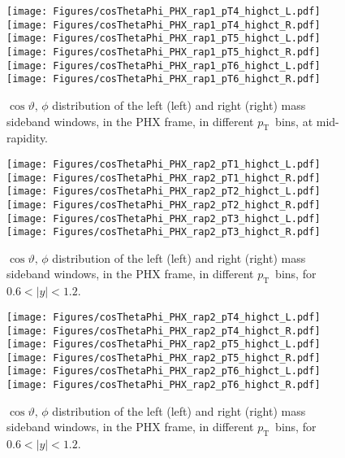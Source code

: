\documentclass[12pt]{article}
\newcommand{\pt}{$p_{\mathrm{T}}$}
\begin{document}
\begin{figure}[htbp]
\centering
\texttt{[image: Figures/cosThetaPhi\_PHX\_rap1\_pT4\_highct\_L.pdf]}
\texttt{[image: Figures/cosThetaPhi\_PHX\_rap1\_pT4\_highct\_R.pdf]}
\texttt{[image: Figures/cosThetaPhi\_PHX\_rap1\_pT5\_highct\_L.pdf]}
\texttt{[image: Figures/cosThetaPhi\_PHX\_rap1\_pT5\_highct\_R.pdf]}
\texttt{[image: Figures/cosThetaPhi\_PHX\_rap1\_pT6\_highct\_L.pdf]}
\texttt{[image: Figures/cosThetaPhi\_PHX\_rap1\_pT6\_highct\_R.pdf]}
\caption{$\cos\vartheta,\,\phi$ distribution of the left (left) and
  right (right) mass sideband windows, in the PHX frame, in different
  \pt\ bins, at mid-rapidity.} 
\end{figure}
\clearpage


\begin{figure}[htbp]
\centering
\texttt{[image: Figures/cosThetaPhi\_PHX\_rap2\_pT1\_highct\_L.pdf]}
\texttt{[image: Figures/cosThetaPhi\_PHX\_rap2\_pT1\_highct\_R.pdf]}
\texttt{[image: Figures/cosThetaPhi\_PHX\_rap2\_pT2\_highct\_L.pdf]}
\texttt{[image: Figures/cosThetaPhi\_PHX\_rap2\_pT2\_highct\_R.pdf]}
\texttt{[image: Figures/cosThetaPhi\_PHX\_rap2\_pT3\_highct\_L.pdf]}
\texttt{[image: Figures/cosThetaPhi\_PHX\_rap2\_pT3\_highct\_R.pdf]}
\caption{$\cos\vartheta,\,\phi$ distribution of the left (left) and
  right (right) mass sideband windows, in the PHX frame, in different
  \pt\ bins, for $0.6 < |y| < 1.2$.}
\end{figure}
\clearpage

\begin{figure}[htbp]
\centering
\texttt{[image: Figures/cosThetaPhi\_PHX\_rap2\_pT4\_highct\_L.pdf]}
\texttt{[image: Figures/cosThetaPhi\_PHX\_rap2\_pT4\_highct\_R.pdf]}
\texttt{[image: Figures/cosThetaPhi\_PHX\_rap2\_pT5\_highct\_L.pdf]}
\texttt{[image: Figures/cosThetaPhi\_PHX\_rap2\_pT5\_highct\_R.pdf]}
\texttt{[image: Figures/cosThetaPhi\_PHX\_rap2\_pT6\_highct\_L.pdf]}
\texttt{[image: Figures/cosThetaPhi\_PHX\_rap2\_pT6\_highct\_R.pdf]}
\caption{$\cos\vartheta,\,\phi$ distribution of the left (left) and
  right (right) mass sideband windows, in the PHX frame, in different
  \pt\ bins, for $0.6 < |y| < 1.2$.} 
\end{figure}
\clearpage
\end{document}

